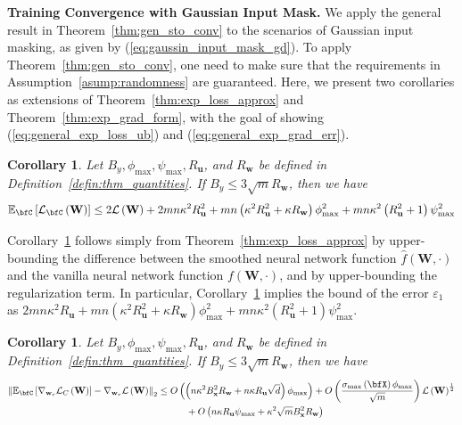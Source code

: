 \documentclass[10pt]{article} %
\newtheorem{corollary}[theorem]{Corollary}
\theoremstyle{definition}
\theoremstyle{plain}
\newcommand{\paren}[1]{\left(#1\right)}
\newcommand{\norm}[1]{\left\|#1\right\|}
\providecommand{\E}{\mathbb{E}}
\def\calL{{\mathcal{L}}}
\def\bfu{{\mathbf{u}}}\def\bfv{{\mathbf{v}}}\def\bfw{{\mathbf{w}}}\def\bfx{{\mathbf{x}}}
\begin{document}
\noindent \textbf{Training Convergence with Gaussian Input Mask.}
We apply the general result in Theorem~\ref{thm:gen_sto_conv} to the scenarios of Gaussian input masking, as given by (\ref{eq:gaussin_input_mask_gd}). To apply Theorem~\ref{thm:gen_sto_conv}, one need to make sure that the requirements in Assumption~\ref{asump:randomness} are guaranteed. Here, we present two corollaries as extensions of Theorem~\ref{thm:exp_loss_approx} and Theorem~\ref{thm:exp_grad_form}, with the goal of showing (\ref{eq:general_exp_loss_ub}) and (\ref{eq:general_exp_grad_err}).

\begin{corollary}
    \label{cor:exp_loss_ub}
    Let $B_y, \phi_{\max},\psi_{\max},R_{\bfu}$, and $R_{\bfw}$ be defined in Definition~\ref{defin:thm_quantities}. If $B_y\leq 3\sqrt{m}R_{\bfw}$, then we have
    \begin{align*}
        \E_{\bfC}\left[\calL_{\bfC}\paren{\mathbf{W}}\right] \leq 2\calL\paren{\mathbf{W}} + 2mn\kappa^2R_{\bfu}^2
        + mn\paren{\kappa^2R_{\bfu}^2 + \kappa R_{\bfw}}\phi_{\max}^2 +
        mn\kappa^2\paren{R_{\bfu}^2+1}\psi_{\max}^2
    \end{align*}
\end{corollary}

Corollary~\ref{cor:exp_loss_ub} follows simply from Theorem~\ref{thm:exp_loss_approx} by upper-bounding the difference between the smoothed neural network function $\hat{f}\paren{\mathbf{W},\cdot}$ and the vanilla neural network function $f\paren{\mathbf{W},\cdot}$, and by upper-bounding the regularization term. In particular, Corollary~\ref{cor:exp_loss_ub} implies the bound of the error $\varepsilon_1$ as $2mn\kappa^2R_{\bfu} + mn\paren{\kappa^2R_{\bfu}^2 + \kappa R_{\bfw}}\phi_{\max}^2 +  mn\kappa^2\paren{R_{\bfu}^2+1}\psi_{\max}^2$. 

\begin{corollary}
    \label{cor:exp_grad_err_ub}
    Let $B_y, \phi_{\max},\psi_{\max},R_{\bfu}$, and $R_{\bfw}$ be defined in Definition~\ref{defin:thm_quantities}. If $B_y\leq 3\sqrt{m}R_{\bfw}$, then we have
    \begin{align*} \norm{\E_{\bfC}\left[\nabla_{\bfw_r}\calL_{C}\paren{\mathbf{W}}\right] - \nabla_{\bfw_r}\calL\paren{\mathbf{W}}}_2
        &\leq O\paren{\paren{n\kappa^2B_{\bfx}^2R_{\bfw} + n\kappa R_{\bfu}\sqrt{d}}\phi_{\max}} + O\paren{\frac{\sigma_{\max}\paren{\bfX}\phi_{\max}}{\sqrt{m}}}\calL\paren{\mathbf{W}}^{\frac{1}{2}}\\
        & \quad\quad\quad  + O\paren{n\kappa R_{\bfu}\psi_{\max}+\kappa^2\sqrt{m}B_{\bfx}^2R_{\bfw}}
    \end{align*}    
\end{corollary}
\end{document}

